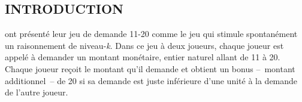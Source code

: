 \begin{Article}



\newpage

\begin{refsection}[UmbhauerFR]  

\section{INTRODUCTION}

\textcite{arad2012} ont présenté leur jeu de demande 11-20
comme le jeu qui stimule spontanément un raisonnement de
niveau-\emph{k}. Dans ce jeu à deux joueurs, chaque joueur est appelé à
demander un montant monétaire, entier naturel allant de 11 à 20. Chaque
joueur reçoit le montant qu'il demande et obtient un bonus --~montant
additionnel~-- de 20 si sa demande est juste inférieure d'une unité à la
demande de l'autre joueur.


\end{refsection}
\end{Article}

